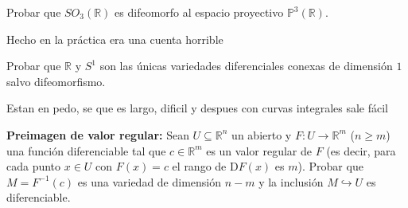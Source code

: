 \documentclass[11pt]{article}
\newcommand{\R}{{\mathbb{R}}}
\numberwithin{theorem}{subsection}
\begin{document}
\begin{question}
	Probar que $SO_3(\R)$ es difeomorfo al espacio proyectivo $\mathbb{P}^3(\R)$.
\end{question}

\begin{solution}
	Hecho en la pr\'actica era una cuenta horrible
\end{solution}

\begin{question}
	Probar que $\R$ y $S^1$ son las \'unicas variedades diferenciales conexas de dimensi\'on $1$ salvo difeomorfismo.
\end{question}

\begin{solution}
	Estan en pedo, se que es largo, dificil y despues con curvas integrales sale f\'acil
\end{solution}

\begin{question}\textbf{Preimagen de valor regular:} Sean $U\subseteq\R^n$ un abierto y $F:U\to\R^m$ ($n\geq m$) una funci\'on diferenciable tal que $c\in\R^m$ es un valor regular de $F$ (es decir, para cada punto $x\in U$ con $F(x)=c$ el rango de $\mathrm{D}F(x)$ es $m$). Probar que $M=F^{-1}(c)$ es una variedad de dimensi\'on $n-m$ y la inclusi\'on $M\hookrightarrow U$ es diferenciable.
\end{question}
\end{document}
